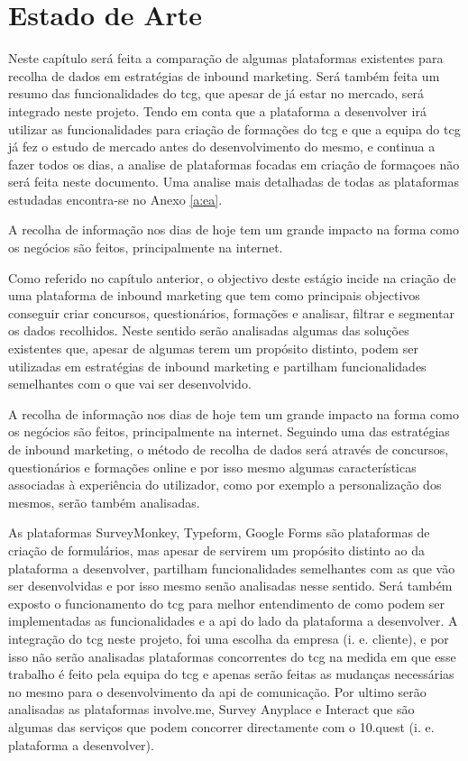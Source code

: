 \chapter{Estado de Arte}
\label{sec:estado-arte}

Neste capítulo será feita a comparação de algumas plataformas existentes para recolha de dados em estratégias de inbound marketing. Será também feita um resumo das funcionalidades do \acrshort{tcg}, que apesar de já estar no mercado, será integrado neste projeto. Tendo em conta que a plataforma a desenvolver irá utilizar as funcionalidades para criação de formações do \acrshort{tcg} e que a equipa do \acrlong{tcg} já fez o estudo de mercado antes do desenvolvimento do mesmo, e continua a fazer todos os dias, a analise de plataformas focadas em criação de formaçoes não será feita neste documento. Uma analise mais detalhadas de todas as plataformas estudadas encontra-se no Anexo \ref{a:ea}.

A recolha de informação nos dias de hoje tem um grande impacto na forma como os negócios são feitos, principalmente na internet.

Como referido no capítulo anterior, o objectivo deste estágio incide na criação de uma plataforma de inbound marketing que tem como principais objectivos conseguir criar concursos, questionários, formações e analisar, filtrar e segmentar os dados recolhidos. Neste sentido serão analisadas algumas das soluções existentes que, apesar de algumas terem um propósito distinto, podem ser utilizadas em estratégias de inbound marketing e partilham funcionalidades semelhantes com o que vai ser desenvolvido. 

A recolha de informação nos dias de hoje tem um grande impacto na forma como os negócios são feitos, principalmente na internet. Seguindo uma das estratégias de inbound marketing, o método de recolha de dados será através de concursos, questionários e formações online e por isso mesmo algumas características associadas à experiência do utilizador, como por exemplo a personalização dos mesmos, serão também analisadas.


As plataformas SurveyMonkey\cite{surveymonkey}, Typeform\cite{typeform}, Google Forms\cite{googleform} são plataformas de criação de formulários, mas apesar de servirem um propósito distinto ao da plataforma a desenvolver, partilham funcionalidades semelhantes com as que vão ser desenvolvidas e por isso mesmo senão analisadas nesse sentido. Será também exposto o funcionamento do \acrshort{tcg} para melhor entendimento de como podem ser implementadas as funcionalidades e a \acrshort{api} do lado da plataforma a desenvolver. A integração do \acrshort{tcg} neste projeto, foi uma escolha da empresa (i. e. cliente), e por isso não serão analisadas plataformas concorrentes do \acrshort{tcg} na medida em que esse trabalho é feito pela equipa do \acrshort{tcg} e apenas serão feitas as mudanças necessárias no mesmo para o desenvolvimento da \acrshort{api} de comunicação. Por ultimo serão analisadas as plataformas involve.me, Survey Anyplace e Interact que são algumas das serviços que podem concorrer directamente com o 10.quest (i. e. plataforma a desenvolver).


